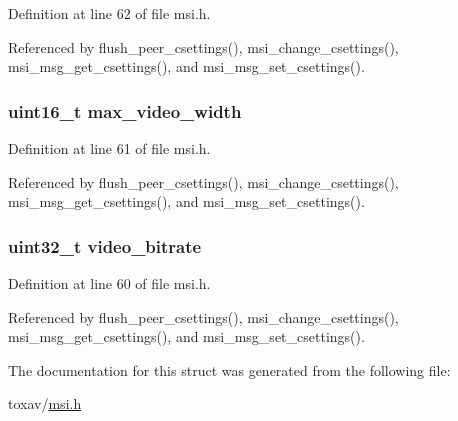Definition at line 62 of file msi.\+h.



Referenced by flush\+\_\+peer\+\_\+csettings(), msi\+\_\+change\+\_\+csettings(), msi\+\_\+msg\+\_\+get\+\_\+csettings(), and msi\+\_\+msg\+\_\+set\+\_\+csettings().

\hypertarget{struct___m_s_i_codec_settings_ab81ecded1f7c46e120c8f2afa7b2c5cc}{
\subsubsection[{max\+\_\+video\+\_\+width}]{\setlength{\rightskip}{0pt plus 5cm}uint16\+\_\+t max\+\_\+video\+\_\+width}}\label{struct___m_s_i_codec_settings_ab81ecded1f7c46e120c8f2afa7b2c5cc}


Definition at line 61 of file msi.\+h.



Referenced by flush\+\_\+peer\+\_\+csettings(), msi\+\_\+change\+\_\+csettings(), msi\+\_\+msg\+\_\+get\+\_\+csettings(), and msi\+\_\+msg\+\_\+set\+\_\+csettings().

\hypertarget{struct___m_s_i_codec_settings_af0eac99d4181795e8a595d244e745192}{
\subsubsection[{video\+\_\+bitrate}]{\setlength{\rightskip}{0pt plus 5cm}uint32\+\_\+t video\+\_\+bitrate}}\label{struct___m_s_i_codec_settings_af0eac99d4181795e8a595d244e745192}


Definition at line 60 of file msi.\+h.



Referenced by flush\+\_\+peer\+\_\+csettings(), msi\+\_\+change\+\_\+csettings(), msi\+\_\+msg\+\_\+get\+\_\+csettings(), and msi\+\_\+msg\+\_\+set\+\_\+csettings().



The documentation for this struct was generated from the following file\+:\begin{DoxyCompactItemize}
\item 
toxav/\hyperlink{msi_8h}{msi.\+h}\end{DoxyCompactItemize}
